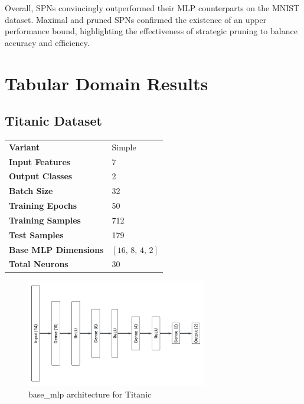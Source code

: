 Overall, SPNs convincingly outperformed their MLP counterparts on the MNIST dataset. Maximal and pruned SPNs confirmed the existence of an upper performance bound, highlighting the effectiveness of strategic pruning to balance accuracy and efficiency.


\section{Tabular Domain Results}

\subsection{Titanic Dataset}

\begin{tabular}{@{}ll@{}}
\textbf{Variant} & Simple \\
\textbf{Input Features} & 7 \\
\textbf{Output Classes} & 2 \\
\textbf{Batch Size} & 32 \\
\textbf{Training Epochs} & 50 \\
\textbf{Training Samples} & 712 \\
\textbf{Test Samples} & 179 \\
\textbf{Base MLP Dimensions} & $[16,\, 8,\, 4,\, 2]$ \\
\textbf{Total Neurons} & 30 \\
\end{tabular}

\begin{figure}[H]
    \centering
    \includegraphics[height=0.28\textheight,width=0.7\textwidth]{Figures/Results/Titanic/titanic_base_mlp_architecture.png} 
    \captionsetup{justification=centering}  %
    \caption{base\_mlp architecture for Titanic}
    \label{fig:titanicMlpBaseArch}
\end{figure}

